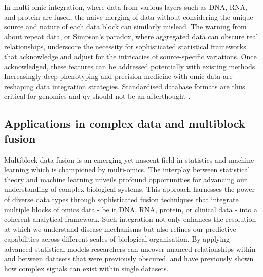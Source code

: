 In multi-omic integration, where data from various layers such as DNA, RNA, and protein are fused, the naive merging of data without considering the unique source and nature of each data block can similarly mislead. 
The warning from \citet{bland1994correlation} about repeat data, or Simpson's paradox, where aggregated data can obscure real relationships, underscore the necessity for sophisticated statistical frameworks that acknowledge and adjust for the intricacies of source-specific variations.
Once acknowledged, these features can be addressed potentially with existing methods
\cite{simpson1951interpretation, wright1934method, pearl2016causal}.
Increasingly deep phenotyping and precision medicine with omic data are reshaping data integration strategies. 
Standardised database formats are thus critical for genomics and \ac{qv} should not be an afterthought \cite{bycroft2018uk, all2024genomic, ogishima2021dbtmm}.

\subsection{Applications in complex data and multiblock fusion} 

Multiblock data fusion is an emerging yet nascent field in statistics and machine learning  which is championed by multi-omics. 
The interplay between statistical theory and machine learning unveils profound opportunities for advancing our understanding of complex biological systems.
This approach harnesses the power of diverse data types through sophisticated fusion techniques that integrate multiple blocks of omics data - be it DNA, RNA, protein, or clinical data - into a coherent analytical framework. 
Such integration not only enhances the resolution at which we understand disease mechanisms but also refines our predictive capabilities across different scales of biological organisation. 
By applying advanced statistical models 
researchers can uncover nuanced relationships within and between datasets that were previously obscured. 
\citet{kong2018nature} and \citet{howe2021within} have previously shown 
how complex signals can exist within single datasets.



